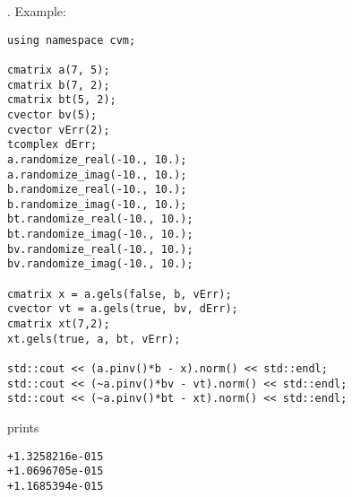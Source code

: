 .
Example:
\begin{Verbatim}
using namespace cvm;

cmatrix a(7, 5);
cmatrix b(7, 2);
cmatrix bt(5, 2);
cvector bv(5);
cvector vErr(2);
tcomplex dErr;
a.randomize_real(-10., 10.);
a.randomize_imag(-10., 10.);
b.randomize_real(-10., 10.);
b.randomize_imag(-10., 10.);
bt.randomize_real(-10., 10.);
bt.randomize_imag(-10., 10.);
bv.randomize_real(-10., 10.);
bv.randomize_imag(-10., 10.);

cmatrix x = a.gels(false, b, vErr);
cvector vt = a.gels(true, bv, dErr);
cmatrix xt(7,2);
xt.gels(true, a, bt, vErr);

std::cout << (a.pinv()*b - x).norm() << std::endl;
std::cout << (~a.pinv()*bv - vt).norm() << std::endl;
std::cout << (~a.pinv()*bt - xt).norm() << std::endl;
\end{Verbatim}
prints
\begin{Verbatim}
+1.3258216e-015
+1.0696705e-015
+1.1685394e-015
\end{Verbatim}
\newpage





